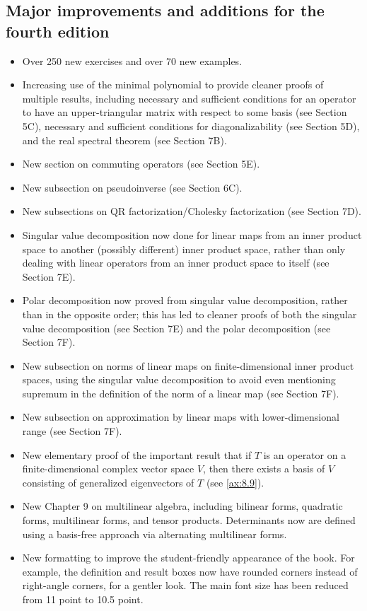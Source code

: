 \subsection*{Major improvements and additions for the fourth edition}

\begin{itemize}
\item Over 250 new exercises and over 70 new examples.
\item Increasing use of the minimal polynomial to provide cleaner proofs of
  multiple results, including necessary and sufficient conditions for an
  operator to have an upper-triangular matrix with respect to some basis (see
  Section 5C), necessary and sufficient conditions for diagonalizability (see
  Section 5D), and the real spectral theorem (see Section 7B).
\item New section on commuting operators (see Section 5E).
\item New subsection on pseudoinverse (see Section 6C).
\item New subsections on QR factorization/Cholesky factorization (see
  Section 7D).
\item Singular value decomposition now done for linear maps from an inner
  product space to another (possibly different) inner product space, rather
  than only dealing with linear operators from an inner product space to itself
  (see Section 7E).
\item Polar decomposition now proved from singular value decomposition, rather
  than in the opposite order; this has led to cleaner proofs of both the
  singular value decomposition (see Section 7E) and the polar decomposition
  (see Section 7F).
\item New subsection on norms of linear maps on finite-dimensional inner
  product spaces, using the singular value decomposition to avoid even
  mentioning supremum in the definition of the norm of a linear map (see
  Section 7F).
\item New subsection on approximation by linear maps with lower-dimensional
  range (see Section 7F).
\item New elementary proof of the important result that if $T$ is an operator
  on a finite-dimensional complex vector space $V$, then there exists a basis
  of $V$ consisting of generalized eigenvectors of $T$ (see \ref{ax:8.9}).
\item New Chapter 9 on multilinear algebra, including bilinear forms, quadratic
  forms, multilinear forms, and tensor products. Determinants now are defined
  using a basis-free approach via alternating multilinear forms.
\item New formatting to improve the student-friendly appearance of the book.
  For example, the definition and result boxes now have rounded corners
  instead of right-angle corners, for a gentler look. The main font size has
  been reduced from 11 point to 10.5 point.
\end{itemize}

